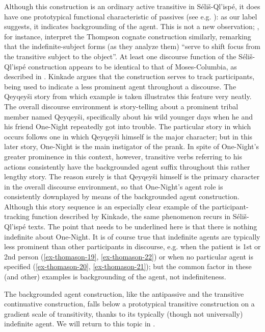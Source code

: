 \documentclass[output=paper,colorlinks,citecolor=brown]{langscibook}
\begin{document}
Although this construction is an ordinary active transitive in
S\'eli\v{s}-Ql'isp\'e, it does have one prototypical functional
characteristic of passives (see e.g. \citealt{Shibatani:1985}): as our label
suggests, it indicates backgrounding of the agent.  This is not a new
observation; \citet[58]{Thompson&Thompson:1992}, for instance, interpret
the Thompson cognate construction similarly, remarking that the
indefinite-subject forms (as they analyze them) “serve to shift focus
from the transitive subject to the object”.  At least one discourse
function of the S\'eli\v{s}-Ql'isp\'e construction appears to be
identical to that of Moses-Columbia, as described in .
Kinkade argues that the construction serves to track participants,
being used to indicate a less prominent agent throughout a discourse.
The Qeyqey\v{s}i story from which example   is taken illustrates this
feature very neatly.  The overall discourse environment is
story-telling about a prominent tribal member named Qeyqey\v{s}i,
specifically about his wild younger days when he and his friend
One-Night repeatedly got into trouble.  The particular story in which
 occurs follows one in which Qeyqey\v{s}i himself is the major
character; but in this later story, One-Night is the main instigator
of the prank.  In spite of One-Night's greater prominence in this
context, however, transitive verbs referring to his actions
consistently have the backgrounded agent suffix throughout this rather
lengthy story.  The reason surely is that Qeyqey\v{s}i himself is the
primary character in the overall discourse environment, so that
One-Night's agent role is consistently downplayed by means of the
backgrounded agent construction.  Although this story sequence is an
especially clear example of the participant-tracking function
described by Kinkade, the same phenomenon recurs in
S\'eli\v{s}-Ql'isp\'e texts.  The point that needs to be underlined
here is that there is nothing indefinite about One-Night.  It is of
course true that indefinite agents are typically less prominent than
other participants in discourse, e.g.  when the patient is 1st or 2nd
person (\ref{ex-thomason-19}, \ref{ex-thomason-22}) or when no particular agent is specified (\ref{ex-thomason-20}, \ref{ex-thomason-21}); but
the common factor in these (and other) examples is backgrounding of
the agent, not indefiniteness.

The backgrounded agent construction, like the antipassive and the
transitive continuative construction, falls below a prototypical
transitive construction on a gradient scale of transitivity, thanks to
its typically (though not universally) indefinite agent.  We will
return to this topic in .
\end{document}
